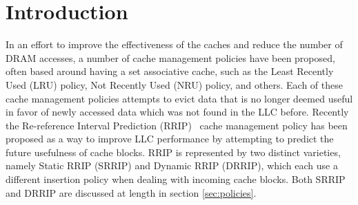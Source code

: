 
\section{Introduction}



In an effort to improve the effectiveness of the caches and reduce the number of DRAM accesses,
 a number of cache management policies have been proposed,
 often based around having a set associative cache,
 such as the Least Recently Used (LRU) policy, Not Recently Used
(NRU) policy, and others.  Each of these cache management policies
attempts to evict data that is no longer deemed useful in favor of newly accessed
data which was not found in the LLC before.  Recently the
Re-reference Interval Prediction (RRIP)~\cite{jaleeltheobald10} cache
management policy has
been proposed as a way to improve LLC performance by attempting to
predict the future usefulness of cache blocks.  RRIP is represented by
two distinct varieties, namely Static RRIP (SRRIP) and Dynamic RRIP
(DRRIP), which
each use a different insertion policy when dealing with incoming
cache blocks.  Both SRRIP and DRRIP are discussed at length in section
\ref{sec:policies}.

